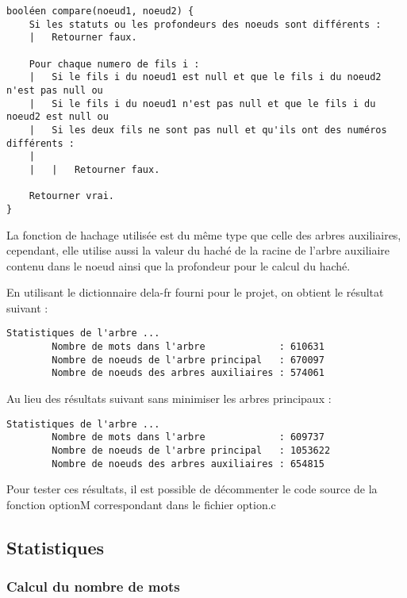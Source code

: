 \documentclass[15pt, a4paper]{article}
\begin{document}
\begin{verbatim}
booléen compare(noeud1, noeud2) {
    Si les statuts ou les profondeurs des noeuds sont différents :
    |   Retourner faux.

    Pour chaque numero de fils i :
    |   Si le fils i du noeud1 est null et que le fils i du noeud2 n'est pas null ou
    |   Si le fils i du noeud1 n'est pas null et que le fils i du noeud2 est null ou
    |   Si les deux fils ne sont pas null et qu'ils ont des numéros différents :
    |
    |   |   Retourner faux.

    Retourner vrai.
}
\end{verbatim}

La fonction de hachage utilisée est du même type que celle des arbres auxiliaires, 
cependant, elle utilise aussi la valeur du haché de la racine de l'arbre auxiliaire
contenu dans le noeud ainsi que la profondeur pour le calcul du haché. 

\bigskip

\noindent En utilisant le dictionnaire dela-fr fourni pour le projet, on 
obtient le résultat suivant :

\begin{verbatim}
Statistiques de l'arbre ...
        Nombre de mots dans l'arbre             : 610631
        Nombre de noeuds de l'arbre principal   : 670097
        Nombre de noeuds des arbres auxiliaires : 574061
\end{verbatim}

\noindent Au lieu des résultats suivant sans minimiser les arbres principaux :

\begin{verbatim}
Statistiques de l'arbre ...
        Nombre de mots dans l'arbre             : 609737
        Nombre de noeuds de l'arbre principal   : 1053622
        Nombre de noeuds des arbres auxiliaires : 654815
\end{verbatim}

Pour tester ces résultats, il est possible de décommenter le code source 
de la fonction optionM correspondant dans le fichier option.c

\subsection{Statistiques}

\subsubsection{Calcul du nombre de mots}
\end{document}
